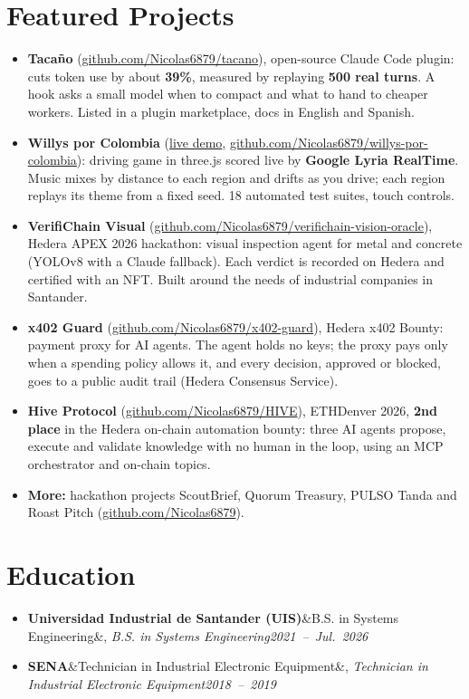 \documentclass[a4paper,10pt]{article}
\newcommand{\entry}[3]{\textbf{#1}\ifx&#2&\else, \textit{#2}\fi \hfill \mbox{\textit{#3}}}
\newcommand{\gh}[1]{\href{https://github.com/Nicolas6879/#1}{github.com/Nicolas6879/#1}}
\begin{document}
\section*{Featured Projects}
\begin{itemize}
    \item \textbf{Tacaño} (\gh{tacano}), open-source Claude Code plugin: cuts token use by about
        \textbf{39\%}, measured by replaying \textbf{500 real turns}. A hook asks a small model
        when to compact and what to hand to cheaper workers. Listed in a plugin marketplace,
        docs in English and Spanish.
    \item \textbf{Willys por Colombia} (\href{https://willys-por-colombia.vercel.app}{live demo},
        \gh{willys-por-colombia}): driving game in three.js scored live by \textbf{Google Lyria
        RealTime}. Music mixes by distance to each region and drifts as you drive; each region
        replays its theme from a fixed seed. 18 automated test suites, touch controls.
    \item \textbf{VerifiChain Visual} (\gh{verifichain-vision-oracle}), Hedera APEX 2026
        hackathon: visual inspection agent for metal and concrete (YOLOv8 with a Claude
        fallback). Each verdict is recorded on Hedera and certified with an NFT. Built around
        the needs of industrial companies in Santander.
    \item \textbf{x402 Guard} (\gh{x402-guard}), Hedera x402 Bounty: payment proxy for AI
        agents. The agent holds no keys; the proxy pays only when a spending policy allows it,
        and every decision, approved or blocked, goes to a public audit trail (Hedera
        Consensus Service).
    \item \textbf{Hive Protocol} (\gh{HIVE}), ETHDenver 2026, \textbf{2nd place} in the Hedera
        on-chain automation bounty: three AI agents propose, execute and validate knowledge
        with no human in the loop, using an MCP orchestrator and on-chain topics.
    \item \textbf{More:} hackathon projects ScoutBrief, Quorum Treasury, PULSO Tanda and Roast
        Pitch (\href{https://github.com/Nicolas6879}{github.com/Nicolas6879}).
\end{itemize}

\section*{Education}
\begin{itemize}
    \item \entry{Universidad Industrial de Santander (UIS)}{B.S. in Systems Engineering}{2021 -- Jul.\ 2026}
    \item \entry{SENA}{Technician in Industrial Electronic Equipment}{2018 -- 2019}
\end{itemize}
\end{document}
